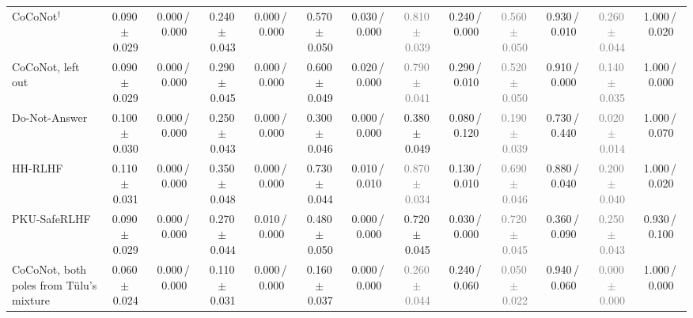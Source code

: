 \begin{tabular}{@{}lcccccccccccc@{}}
CoCoNot$^\dagger$ & 0.090\,{\scriptsize$\pm$\,0.029} & {\scriptsize 0.000\,/\,0.000} & 0.240\,{\scriptsize$\pm$\,0.043} & {\scriptsize 0.000\,/\,0.000} & 0.570\,{\scriptsize$\pm$\,0.050} & {\scriptsize 0.030\,/\,0.000} & \textcolor{gray}{0.810\,{\scriptsize$\pm$\,0.039}} & {\scriptsize 0.240\,/\,0.000} & \textcolor{gray}{0.560\,{\scriptsize$\pm$\,0.050}} & {\scriptsize 0.930\,/\,0.010} & \textcolor{gray}{0.260\,{\scriptsize$\pm$\,0.044}} & {\scriptsize 1.000\,/\,0.020} \\
CoCoNot, left out & 0.090\,{\scriptsize$\pm$\,0.029} & {\scriptsize 0.000\,/\,0.000} & 0.290\,{\scriptsize$\pm$\,0.045} & {\scriptsize 0.000\,/\,0.000} & 0.600\,{\scriptsize$\pm$\,0.049} & {\scriptsize 0.020\,/\,0.000} & \textcolor{gray}{0.790\,{\scriptsize$\pm$\,0.041}} & {\scriptsize 0.290\,/\,0.010} & \textcolor{gray}{0.520\,{\scriptsize$\pm$\,0.050}} & {\scriptsize 0.910\,/\,0.000} & \textcolor{gray}{0.140\,{\scriptsize$\pm$\,0.035}} & {\scriptsize 1.000\,/\,0.000} \\
Do-Not-Answer & 0.100\,{\scriptsize$\pm$\,0.030} & {\scriptsize 0.000\,/\,0.000} & 0.250\,{\scriptsize$\pm$\,0.043} & {\scriptsize 0.000\,/\,0.000} & 0.300\,{\scriptsize$\pm$\,0.046} & {\scriptsize 0.000\,/\,0.000} & 0.380\,{\scriptsize$\pm$\,0.049} & {\scriptsize 0.080\,/\,0.120} & \textcolor{gray}{0.190\,{\scriptsize$\pm$\,0.039}} & {\scriptsize 0.730\,/\,0.440} & \textcolor{gray}{0.020\,{\scriptsize$\pm$\,0.014}} & {\scriptsize 1.000\,/\,0.070} \\
HH-RLHF & 0.110\,{\scriptsize$\pm$\,0.031} & {\scriptsize 0.000\,/\,0.000} & 0.350\,{\scriptsize$\pm$\,0.048} & {\scriptsize 0.000\,/\,0.000} & 0.730\,{\scriptsize$\pm$\,0.044} & {\scriptsize 0.010\,/\,0.010} & \textcolor{gray}{0.870\,{\scriptsize$\pm$\,0.034}} & {\scriptsize 0.130\,/\,0.010} & \textcolor{gray}{0.690\,{\scriptsize$\pm$\,0.046}} & {\scriptsize 0.880\,/\,0.040} & \textcolor{gray}{0.200\,{\scriptsize$\pm$\,0.040}} & {\scriptsize 1.000\,/\,0.020} \\
PKU-SafeRLHF & 0.090\,{\scriptsize$\pm$\,0.029} & {\scriptsize 0.000\,/\,0.000} & 0.270\,{\scriptsize$\pm$\,0.044} & {\scriptsize 0.010\,/\,0.000} & 0.480\,{\scriptsize$\pm$\,0.050} & {\scriptsize 0.000\,/\,0.000} & 0.720\,{\scriptsize$\pm$\,0.045} & {\scriptsize 0.030\,/\,0.000} & \textcolor{gray}{0.720\,{\scriptsize$\pm$\,0.045}} & {\scriptsize 0.360\,/\,0.090} & \textcolor{gray}{0.250\,{\scriptsize$\pm$\,0.043}} & {\scriptsize 0.930\,/\,0.100} \\
CoCoNot, both poles from T\"ulu's mixture & 0.060\,{\scriptsize$\pm$\,0.024} & {\scriptsize 0.000\,/\,0.000} & 0.110\,{\scriptsize$\pm$\,0.031} & {\scriptsize 0.000\,/\,0.000} & 0.160\,{\scriptsize$\pm$\,0.037} & {\scriptsize 0.000\,/\,0.000} & \textcolor{gray}{0.260\,{\scriptsize$\pm$\,0.044}} & {\scriptsize 0.240\,/\,0.060} & \textcolor{gray}{0.050\,{\scriptsize$\pm$\,0.022}} & {\scriptsize 0.940\,/\,0.060} & \textcolor{gray}{0.000\,{\scriptsize$\pm$\,0.000}} & {\scriptsize 1.000\,/\,0.000} \\

\end{tabular}
